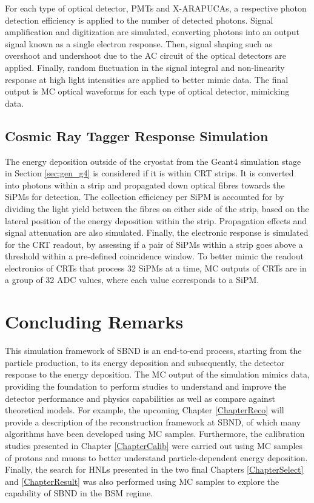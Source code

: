 For each type of optical detector, PMTs and X-ARAPUCAs, a respective photon detection efficiency is applied to the number of detected photons.
Signal amplification and digitization are simulated, converting photons into an output signal known as a single electron response.
Then, signal shaping such as overshoot and undershoot due to the AC circuit of the optical detectors are applied.
Finally, random fluctuation in the signal integral and non-linearity response at high light intensities are applied to better mimic data.
The final output is MC optical waveforms for each type of optical detector, mimicking data. 

\subsection{Cosmic Ray Tagger Response Simulation}
\label{sec:crt_response}

The energy deposition outside of the cryostat from the Geant4 simulation stage in Section \ref{sec:gen_g4} is considered if it is within CRT strips.
It is converted into photons within a strip and propagated down optical fibres towards the SiPMs for detection.
The collection efficiency per SiPM is accounted for by dividing the light yield between the fibres on either side of the strip, based on the lateral position of the energy deposition within the strip.
Propagation effects and signal attenuation are also simulated.
Finally, the electronic response is simulated for the CRT readout, by assessing if a pair of SiPMs within a strip goes above a threshold within a pre-defined coincidence window.
To better mimic the readout electronics of CRTs that process 32 SiPMs at a time, MC outputs of CRTs are in a group of 32 ADC values, where each value corresponds to a SiPM.

\section{Concluding Remarks}
\label{sec:sim_concluding_remarks}

This simulation framework of SBND is an end-to-end process, starting from the particle production, to its energy deposition and subsequently, the detector response to the energy deposition.
The MC output of the simulation mimics data, providing the foundation to perform studies to understand and improve the detector performance and physics capabilities as well as compare against theoretical models.
For example, the upcoming Chapter \ref{ChapterReco} will provide a description of the reconstruction framework at SBND, of which many algorithms have been developed using MC samples.
Furthermore, the calibration studies presented in Chapter \ref{ChapterCalib} were carried out using MC samples of protons and muons to better understand particle-dependent energy deposition.
Finally, the search for HNLs presented in the two final Chapters \ref{ChapterSelect} and \ref{ChapterResult} was also performed using MC samples to explore the capability of SBND in the BSM regime.
